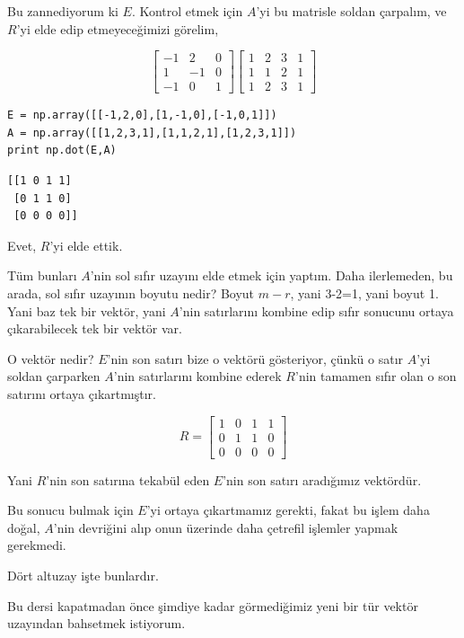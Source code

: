 \documentclass[12pt,fleqn]{article}\usepackage{../../common}
\begin{document}
Bu zannediyorum ki $E$. Kontrol etmek için $A$'yi bu matrisle soldan
çarpalım, ve $R$'yi elde edip etmeyeceğimizi görelim,

$$ 
\left[\begin{array}{rrr}
-1 &  2 & 0 \\
1 & -1 & 0 \\
-1 & 0 & 1
\end{array}\right]
\left[\begin{array}{rrrr}
1 & 2 & 3 & 1 \\
1 & 1 & 2 & 1 \\
1 & 2 & 3 & 1
\end{array}\right]
 $$

\begin{verbatim}
E = np.array([[-1,2,0],[1,-1,0],[-1,0,1]])
A = np.array([[1,2,3,1],[1,1,2,1],[1,2,3,1]])
print np.dot(E,A)
\end{verbatim}

\begin{verbatim}
[[1 0 1 1]
 [0 1 1 0]
 [0 0 0 0]]
\end{verbatim}

Evet, $R$'yi elde ettik. 

Tüm bunları $A$'nin sol sıfır uzayını elde etmek için yaptım. Daha
ilerlemeden, bu arada, sol sıfır uzayının boyutu nedir? Boyut $m-r$, yani
3-2=1, yani boyut 1. Yani baz tek bir vektör, yani $A$'nin satırlarını
kombine edip sıfır sonucunu ortaya çıkarabilecek tek bir vektör var. 

O vektör nedir? $E$'nin son satırı bize o vektörü gösteriyor, çünkü o satır
$A$'yi soldan çarparken $A$'nin satırlarını kombine ederek $R$'nin tamamen
sıfır olan o son satırını ortaya çıkartmıştır. 

$$ R =
\left[\begin{array}{rrrr}
1 & 0 & 1 & 1 \\
0 & 1 & 1 & 0 \\
0 & 0 & 0 & 0
\end{array}\right]
 $$

Yani $R$'nin son satırına tekabül eden $E$'nin son satırı aradığımız
vektördür.

Bu sonucu bulmak için $E$'yi ortaya çıkartmamız gerekti, fakat bu işlem
daha doğal, $A$'nin devriğini alıp onun üzerinde daha çetrefil işlemler
yapmak gerekmedi. 

Dört altuzay işte bunlardır. 

Bu dersi kapatmadan önce şimdiye kadar görmediğimiz yeni bir tür vektör
uzayından bahsetmek istiyorum. 
\end{document}
